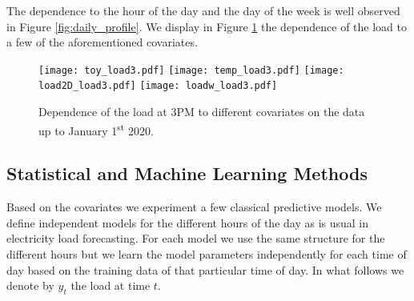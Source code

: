 \documentclass[transmag]{IEEEtran}
\begin{document}
The dependence to the hour of the day and the day of the week is well observed in Figure \ref{fig:daily_profile}. We display in Figure \ref{fig:explore} the dependence of the load to a few of the aforementioned covariates.
\begin{figure}
    \centering
    \texttt{[image: toy\_load3.pdf]}
    \texttt{[image: temp\_load3.pdf]}
    \texttt{[image: load2D\_load3.pdf]}
    \texttt{[image: loadw\_load3.pdf]}
    \caption{Dependence of the load at 3PM to different covariates on the data up to January 1\textsuperscript{st} 2020.}
    \label{fig:explore}
\end{figure}


\subsection{Statistical and Machine Learning Methods}\label{sec:statsml}
Based on the covariates we experiment a few classical predictive models. We define independent models for the different hours of the day as is usual in electricity load forecasting. For each model we use the same structure for the different hours but we learn the model parameters independently for each time of day based on the training data of that particular time of day. In what follows we denote by $y_t$ the load at time $t$.
\end{document}
